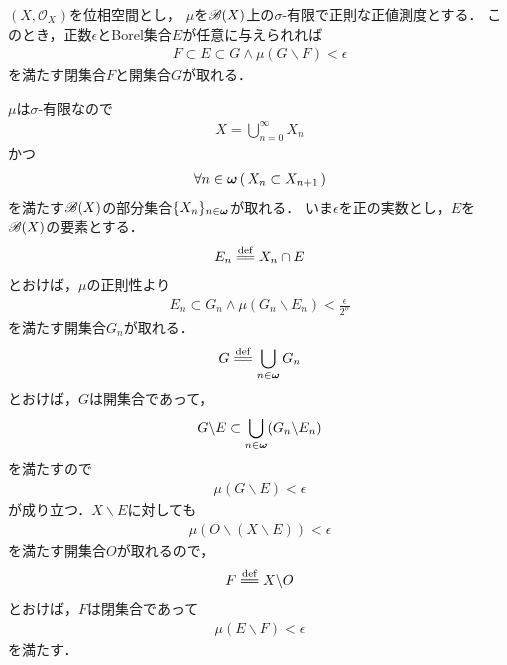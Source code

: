 		\begin{screen}
			\begin{thm}
				$(X,\mathscr{O}_X)$を位相空間とし，
				$\mu$を$\mathscr{B}(X)$上の$\sigma$-有限で正則な正値測度とする．
				このとき，正数$\epsilon$とBorel集合$E$が任意に与えられれば
				\begin{align}
					F \subset E \subset G \wedge \mu(G \backslash F) < \epsilon
				\end{align}
				を満たす閉集合$F$と開集合$G$が取れる．
			\end{thm}
		\end{screen}
		
		\begin{sketch}
			$\mu$は$\sigma$-有限なので
			\begin{align}
				X = \bigcup_{n=0}^\infty X_n
			\end{align}
			かつ
			\begin{align}
				\forall n \in {\boldsymbol \omega}\, (\, X_n \subset X_{n+1}\, )
			\end{align}
			を満たす$\mathscr{B}(X)$の部分集合$\{X_n\}_{n \in {\boldsymbol \omega}}$が取れる．
			いま$\epsilon$を正の実数とし，$E$を$\mathscr{B}(X)$の要素とする．
			\begin{align}
				E_n \defeq X_n \cap E
			\end{align}
			とおけば，$\mu$の正則性より
			\begin{align}
				E_n \subset G_n \wedge \mu(G_n \backslash E_n) < \frac{\epsilon}{2^n}
			\end{align}
			を満たす開集合$G_n$が取れる．
			\begin{align}
				G \defeq \bigcup_{n \in \Natural} G_n
			\end{align}
			とおけば，$G$は開集合であって，
			\begin{align}
				G \backslash E \subset \bigcup_{n \in {\boldsymbol \omega}} (G_n \backslash E_n)
			\end{align}
			を満たすので
			\begin{align}
				\mu(G \backslash E) < \epsilon
			\end{align}
			が成り立つ．$X \backslash E$に対しても
			\begin{align}
				\mu(O \backslash (X \backslash E)) < \epsilon
			\end{align}
			を満たす開集合$O$が取れるので，
			\begin{align}
				F \defeq X \backslash O
			\end{align}
			とおけば，$F$は閉集合であって
			\begin{align}
				\mu(E \backslash F) < \epsilon
			\end{align}
			を満たす．
			\QED
		\end{sketch}
		
